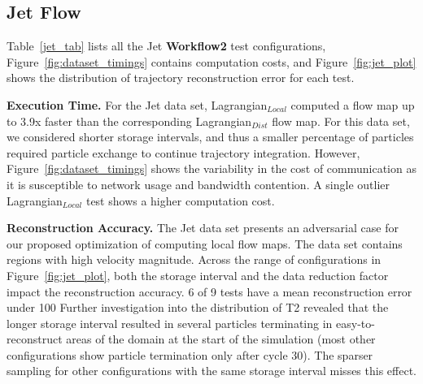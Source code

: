 


\subsection{Jet Flow}
\label{sec:jet}
Table~\ref{jet_tab} lists all the Jet \textbf{Workflow2} test configurations, Figure~\ref{fig:dataset_timings} contains computation costs, and Figure~\ref{fig:jet_plot} shows the distribution of trajectory reconstruction error for each test.
%


\textbf{Execution Time.} For the Jet data set, Lagrangian$_{Local}$ computed a flow map up to 3.9x faster than the corresponding Lagrangian$_{Dist}$ flow map.
%
For this data set, we considered shorter storage intervals, and thus a smaller percentage of particles required particle exchange to continue trajectory integration.
%
However, Figure~\ref{fig:dataset_timings} shows the variability in the cost of communication as it is susceptible to network usage and bandwidth contention.
%
A single outlier Lagrangian$_{Local}$ test shows a higher computation cost. 



\textbf{Reconstruction Accuracy.} The Jet data set presents an adversarial case for our proposed optimization of computing local flow maps.
%
The data set contains regions with high velocity magnitude.
%
Across the range of configurations in Figure~\ref{fig:jet_plot}, both the storage interval and the data reduction factor impact the reconstruction accuracy.
%
6 of 9 tests have a mean reconstruction error under 100%
%
Further investigation into the distribution of T2 revealed that the longer storage interval resulted in several particles terminating in easy-to-reconstruct areas of the domain at the start of the simulation (most other configurations show particle termination only after cycle 30).
%
%
The sparser sampling for other configurations with the same storage interval misses this effect.
%
%

